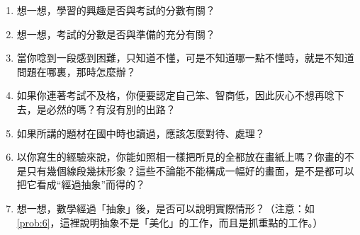 \begin{enumerate}[1., leftmargin=2em]
  \item 想一想，學習的興趣是否與考試的分數有關？\label{prob:1}
  \item 想一想，考試的分數是否與準備的充分有關？\label{prob:2}
  \item 當你唸到一段感到困難，只知道不懂，可是不知道哪一點不懂時，就是不知道問題在哪裏，那時怎麼辦？\label{prob:3}
  \item 如果你連著考試不及格，你便要認定自己笨、智商低，因此灰心不想再唸下去，是必然的嗎？有沒有別的出路？\label{prob:4}
  \item 如果所講的題材在國中時也讀過，應該怎麼對待、處理？\label{prob:5}
  \item 以你寫生的經驗來說，你能如照相一樣把所見的全都放在畫紙上嗎？你畫的不是只有幾個線段幾抹形象？這些不論能不能構成一幅好的畫面，是不是都可以把它看成“經過抽象”而得的？\label{prob:6}
  \item 想一想，數學經過「抽象」後，是否可以說明實際情形？（注意：如\cref{prob:6}，這裡說明抽象不是「美化」的工作，而且是抓重點的工作。）\label{prob:7}
\end{enumerate}
